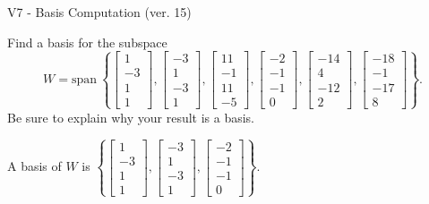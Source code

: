 \begin{exercise}
  \begin{exerciseTitle}V7 - Basis Computation (ver. 15)\end{exerciseTitle}
  \begin{exerciseStatement}
    Find a basis for the subspace 
\[W=\mathrm{span}\ \left\{\left[\begin{array}{r}
1 \\
-3 \\
1 \\
1
\end{array}\right] , \left[\begin{array}{r}
-3 \\
1 \\
-3 \\
1
\end{array}\right] , \left[\begin{array}{r}
11 \\
-1 \\
11 \\
-5
\end{array}\right] , \left[\begin{array}{r}
-2 \\
-1 \\
-1 \\
0
\end{array}\right] , \left[\begin{array}{r}
-14 \\
4 \\
-12 \\
2
\end{array}\right] , \left[\begin{array}{r}
-18 \\
-1 \\
-17 \\
8
\end{array}\right]\right\}.\]
 Be sure to explain why your result is a basis.


  \end{exerciseStatement}
  \begin{exerciseAnswer}
   A basis of \(W\) is  \(\left\{\left[\begin{array}{r}
1 \\
-3 \\
1 \\
1
\end{array}\right] , \left[\begin{array}{r}
-3 \\
1 \\
-3 \\
1
\end{array}\right] , \left[\begin{array}{r}
-2 \\
-1 \\
-1 \\
0
\end{array}\right]\right\}\).
  


  \end{exerciseAnswer}
\end{exercise}